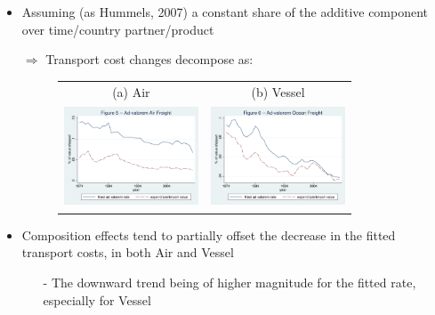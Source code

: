 \documentclass[10 pt,Helvetica, french]{beamer}
\begin{document}
\begin{frame}
\begin{itemize}
\item Assuming (as Hummels, 2007) a constant share of the additive component over time/country partner/product \vspace{0.1cm}
\item[$\Rightarrow$] Transport cost changes decompose as:
\begin{figure}[htbp]
\begin{center}
\begin{tabular}{cc}
{\scriptsize (a) Air } & {\scriptsize (b) Vessel}\\
\includegraphics[width=4cm, height=3cm]{figure5_comme_hummels_air.pdf}
& \includegraphics[width=4cm,height=3cm]{figure6_comme_hummels_ocean.pdf} \\
\end{tabular}
\end{center}
\end{figure}
\item Composition effects tend to partially offset the decrease in the fitted transport costs, in both Air and Vessel \vspace{0.1cm}
\begin{itemize}
\item[-] The downward trend being of higher magnitude for the fitted rate, especially for Vessel
\end{itemize}
\end{itemize}
\end{frame}
\end{document}
